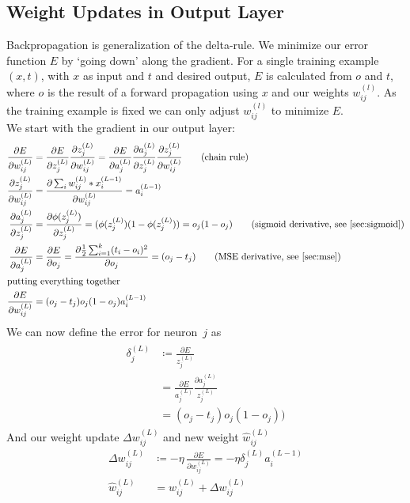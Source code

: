 \subsection{Weight Updates in Output Layer}
Backpropagation is generalization of the delta-rule. We minimize our error function $E$ by `going down' along the gradient. For a single training example~$(x, t)$, with $x$ as input and $t$ and desired output, $E$ is calculated from $o$ and $t$, where $o$ is the result of a forward propagation using $x$ and our weights $w_{ij}^{(l)}$. As the training example is fixed we can only adjust $w_{ij}^{(l)}$ to minimize $E$.\\
We start with the gradient in our output layer:
\begin{align}
\frac{\partial E}{\partial w_{ij}^{(L)}} &= \frac{\partial E}{\partial z_j^{(L)}} \frac{\partial z_j^{(L)}}{\partial w_{ij}^{(L)}}
= \frac{\partial E}{\partial a_j^{(L)}} \frac{\partial a_j^{(L)}}{\partial z_j^{(L)}} \frac{\partial z_j^{(L)}}{\partial w_{ij}^{(L)}}
 \tag{chain rule}\\
\frac{\partial z_j^{(L)}}{\partial w_{ij}^{(L)}} &= \frac{\partial \sum_i w_{ij}^{(L)} * x_i^{(L-1)} }{\partial w_{ij}^{(L)}}
= a_i^{(L-1)}\\
\frac{\partial a_j^{(L)}}{\partial z_j^{(L)}} &= \frac{\partial \phi(z_j^{(L)})}{\partial z_j^{(L)}}
= (\phi(z_j^{(L)}) (1 - \phi(z_j^{(L)}))
= o_j (1 - o_j) \tag{sigmoid derivative, see \ref{sec:sigmoid}} \\
\frac{\partial E}{\partial a_j^{(L)}} &= \frac{\partial E}{\partial o_j}
= \frac{\partial \half \sum_{i=1}^k (t_i - o_i)^2}{\partial o_j}
= (o_j - t_j) \tag{MSE derivative, see \ref{sec:mse}}\\
\intertext{putting everything together}
\frac{\partial E}{\partial w_{ij}^{(L)}} &= (o_j - t_j) o_j (1 - o_j) a_i^{(L-1)}
\end{align}
We can now define the error for neuron~$j$ as
\begin{align}
\begin{split}
\delta_j^{(L)} &\coloneqq \frac{\partial E}{z_j^{(L)}}\\
&= \frac{\partial E}{a_j^{(L)}} \frac{\partial a_j^{(L)}}{z_j^{(L)}}\\
&= (o_j - t_j) o_j (1 - o_j))
\end{split}
\end{align}
And our weight update $\Delta w_{ij}^{(L)}$ and new weight $\hat w_{ij}^{(L)}$
\begin{align}
\Delta w_{ij}^{(L)} &\coloneqq - \eta\, \frac{\partial E}{\partial w_{ij}^{(L)}}
= - \eta \delta_j^{(L)} a_i^{(L-1)}\\
\hat w_{ij}^{(L)} &= w_{ij}^{(L)} + \Delta w_{ij}^{(L)}
\end{align}


